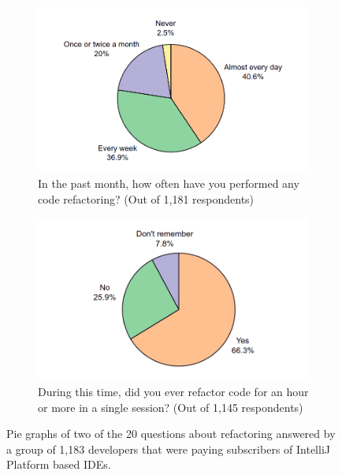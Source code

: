 \begin{figure}
\centering
\begin{subfigure}{.5\textwidth}
  \centering
  \includegraphics[width=1.2\linewidth]{figuras/q1pizza.png}
  \caption{In the past month, how
often have you performed any code refactoring? (Out of 1,181
respondents)}
  \label{fig:q1}
\end{subfigure}
\begin{subfigure}{.5\textwidth}
  \centering
  \includegraphics[width=1.2\linewidth]{figuras/q2pizza.png}
  \caption{During this time, did you ever refactor code for an hour or more in a single session? (Out of 1,145 respondents)}
  \label{fig:q2}
\end{subfigure}
\caption{Pie graphs of two of the 20 questions about refactoring answered by a group of 1,183 developers that were paying subscribers of IntelliJ Platform based IDEs. \citep{1001}}
\label{fig:pizzas}
\end{figure}


